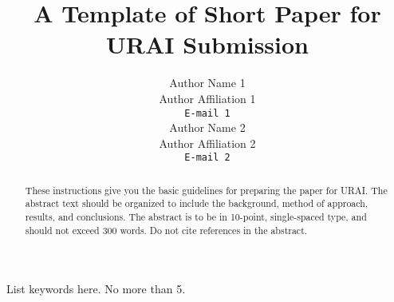 \documentclass[conf]{ieeeconf}                            %
\begin{document}
\title{\LARGE \bf A Template of Short Paper for URAI Submission }

\author{ \parbox{3 in}{\centering Author Name 1 \\
         Author Affiliation 1 \\
         {\tt\small E-mail 1}}
         \hspace*{ 0.5 in}
         \parbox{3 in}{ \centering Author Name 2 \\
         Author Affiliation 2 \\
         {\tt\small E-mail 2}}
}

\maketitle
\markboth{\hspace{1.52 in} {}}{}

\begin{abstract}

These instructions give you the basic guidelines for preparing the
paper for URAI. The abstract text should be organized to
include the background, method of approach, results, and
conclusions. The abstract is to be in 10-point, single-spaced
type, and should not exceed 300 words. Do not cite references in
the abstract.

\end{abstract}


\vspace{5pt}


\begin{keywords}

List keywords here. No more than 5.

\end{keywords}
\end{document}
